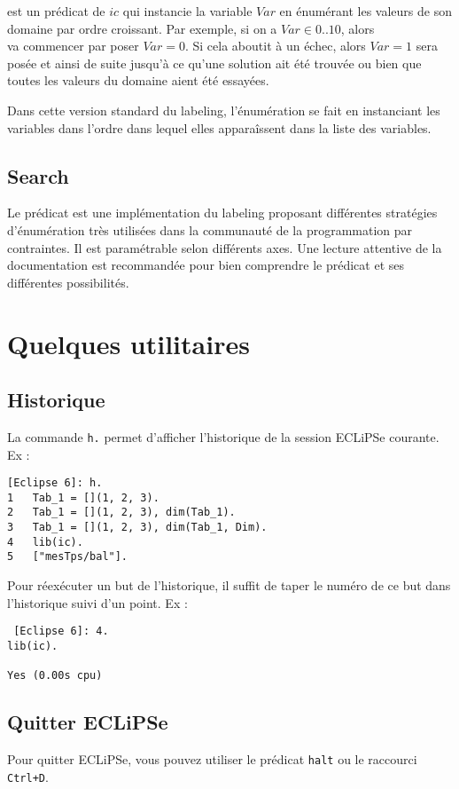  est un prédicat de $ic$ qui instancie la variable
$Var$ en énumérant les valeurs de son domaine par ordre croissant.
Par exemple, si on a $Var \in 0 .. 10$, alors \\
 va commencer par poser $Var = 0$. Si cela aboutit
à un échec, alors $Var = 1$ sera posée et ainsi de suite jusqu'à ce
qu'une solution ait été trouvée ou bien que toutes les valeurs du
domaine aient été essayées.

Dans cette version standard du labeling, l'énumération se fait en
instanciant les variables dans l'ordre dans lequel elles apparaîssent
dans la liste des variables.


\subsection{Search}

Le prédicat  est une implémentation du labeling proposant
différentes stratégies d'énumération très utilisées dans la communauté
de la programmation par contraintes. Il est paramétrable selon
différents axes.  Une lecture attentive de la documentation est
recommandée pour bien comprendre le prédicat et ses différentes
possibilités.



\section{Quelques utilitaires}

\subsection{Historique}
La commande \verb|h.| permet d'afficher l'historique de la session ECLiPSe courante. Ex :
\begin{verbatim}
[Eclipse 6]: h.
1	Tab_1 = [](1, 2, 3).
2	Tab_1 = [](1, 2, 3), dim(Tab_1).
3	Tab_1 = [](1, 2, 3), dim(Tab_1, Dim).
4	lib(ic).
5	["mesTps/bal"].
\end{verbatim}

Pour réexécuter un but de l'historique, il suffit de taper le numéro de ce but dans l'historique suivi d'un point. Ex :
\begin{verbatim}
 [Eclipse 6]: 4.
lib(ic).

Yes (0.00s cpu)
\end{verbatim}

\subsection{Quitter ECLiPSe}
Pour quitter ECLiPSe, vous pouvez utiliser le prédicat \verb|halt| ou le raccourci \verb|Ctrl+D|.


